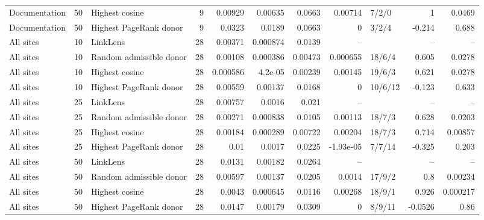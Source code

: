 \begin{table}[t]
{\begin{tabular}{lrlrrrrrlrr}
Documentation & 50 & Highest cosine & 9 & 0.00929 & 0.00635 & 0.0663 & 0.00714 & 7/2/0 & 1 & 0.0469 \\
Documentation & 50 & Highest PageRank donor & 9 & 0.0323 & 0.0189 & 0.0663 & 0 & 3/2/4 & -0.214 & 0.688 \\
All sites & 10 & LinkLens & 28 & 0.00371 & 0.000874 & 0.0139 & -- &  & -- & -- \\
All sites & 10 & Random admissible donor & 28 & 0.00108 & 0.000386 & 0.00473 & 0.000655 & 18/6/4 & 0.605 & 0.0278 \\
All sites & 10 & Highest cosine & 28 & 0.000586 & 4.2e-05 & 0.00239 & 0.00145 & 19/6/3 & 0.621 & 0.0278 \\
All sites & 10 & Highest PageRank donor & 28 & 0.00559 & 0.00137 & 0.0168 & 0 & 10/6/12 & -0.123 & 0.633 \\
All sites & 25 & LinkLens & 28 & 0.00757 & 0.0016 & 0.021 & -- &  & -- & -- \\
All sites & 25 & Random admissible donor & 28 & 0.00271 & 0.000838 & 0.0105 & 0.00113 & 18/7/3 & 0.628 & 0.0203 \\
All sites & 25 & Highest cosine & 28 & 0.00184 & 0.000289 & 0.00722 & 0.00204 & 18/7/3 & 0.714 & 0.00857 \\
All sites & 25 & Highest PageRank donor & 28 & 0.01 & 0.0017 & 0.0225 & -1.93e-05 & 7/7/14 & -0.325 & 0.203 \\
All sites & 50 & LinkLens & 28 & 0.0131 & 0.00182 & 0.0264 & -- &  & -- & -- \\
All sites & 50 & Random admissible donor & 28 & 0.00597 & 0.00137 & 0.0205 & 0.0014 & 17/9/2 & 0.8 & 0.00234 \\
All sites & 50 & Highest cosine & 28 & 0.0043 & 0.000645 & 0.0116 & 0.00268 & 18/9/1 & 0.926 & 0.000217 \\
All sites & 50 & Highest PageRank donor & 28 & 0.0147 & 0.00179 & 0.0309 & 0 & 8/9/11 & -0.0526 & 0.86 \\
\bottomrule
\end{tabular}}
\end{table}
